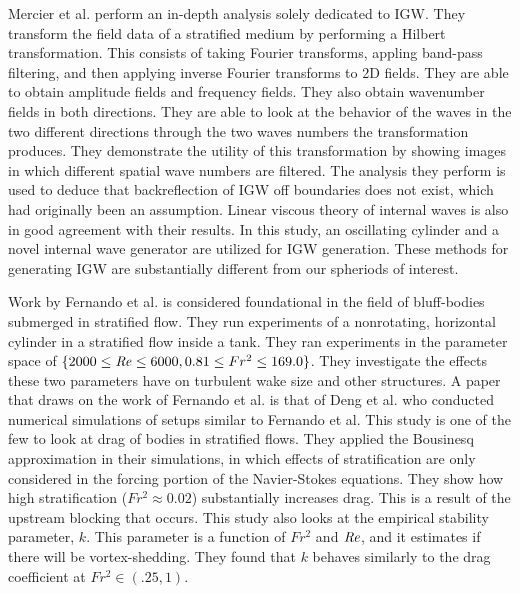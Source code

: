 Mercier et al. \cite{mercier_reflection_2008} perform an in-depth analysis solely dedicated to IGW. They transform the field data of a stratified medium by performing a Hilbert transformation. This consists of taking Fourier transforms, appling band-pass filtering, and then applying inverse Fourier transforms to 2D fields. They are able to obtain amplitude fields and frequency fields. They also obtain wavenumber fields in both directions. They are able to look at the behavior of the waves in the two different directions through the two waves numbers the transformation produces. They demonstrate the utility of this transformation by showing images in which different spatial wave numbers are filtered. The analysis they perform is used to deduce that backreflection of IGW off boundaries does not exist, which had originally been an assumption. Linear viscous theory of internal waves is also in good agreement with their results. In this study, an oscillating cylinder and a novel internal wave generator are utilized for IGW generation. These methods for generating IGW are substantially different from our spheriods of interest. 

Work by Fernando et al. is considered foundational in the field of bluff-bodies submerged in stratified flow. They run experiments of a nonrotating, horizontal cylinder in a stratified flow inside a tank. They ran experiments in the parameter space of $\{2000 \leq \mathit{Re} \leq 6000, 0.81 \leq Fr^2 \leq  169.0\}$. They investigate the effects these two parameters have on turbulent wake size and other structures. A paper that draws on the work of Fernando et al. is that of Deng et al. \cite{deng_drag_2022} who conducted numerical simulations of setups similar to Fernando et al. This study is one of the few to look at drag of bodies in stratified flows. They applied the Bousinesq approximation in their simulations, in which effects of stratification are only considered in the forcing portion of the Navier-Stokes equations. They show how high stratification ($Fr^2 \approx 0.02$) substantially increases drag. This is a result of the upstream blocking that occurs. This study also looks at the empirical stability parameter, $k$. This parameter is a function of $Fr^2$ and $\mathit{Re}$, and it estimates if there will be vortex-shedding. They found that $k$ behaves similarly to the drag coefficient at $Fr^2 \in (.25, 1)$.


